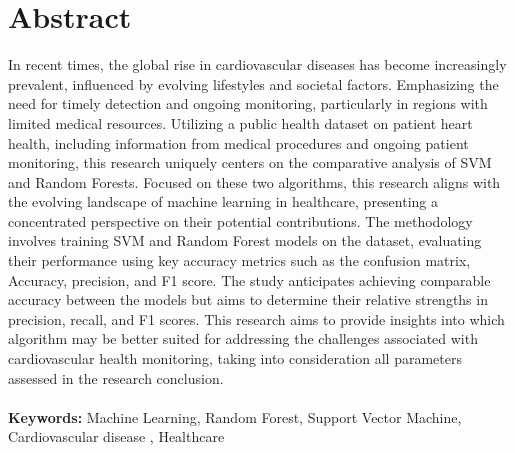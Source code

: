 \chapter*{\center \Large  Abstract}

In recent times, the global rise in cardiovascular diseases has become increasingly prevalent, influenced by evolving lifestyles and societal factors. Emphasizing the need for timely detection and ongoing monitoring, particularly in regions with limited medical resources. Utilizing a public health dataset on patient heart health, including information from medical procedures and ongoing patient monitoring, this research uniquely centers on the comparative analysis of SVM and Random Forests. Focused on these two algorithms, this research aligns with the evolving landscape of machine learning in healthcare, presenting a concentrated perspective on their potential contributions. The methodology involves training SVM and Random Forest models on the dataset, evaluating their performance using key accuracy metrics such as the confusion matrix, Accuracy, precision, and F1 score. The study anticipates achieving comparable accuracy between the models but aims to determine their relative strengths in precision, recall, and F1 scores. This research aims to provide insights into which algorithm may be better suited for addressing the challenges associated with cardiovascular health monitoring, taking into consideration all parameters assessed in the research conclusion.
\\

\noindent %
\\

\textbf{Keywords:} Machine Learning, Random Forest, Support Vector Machine, Cardiovascular disease , Healthcare

\vfill
\noindent


